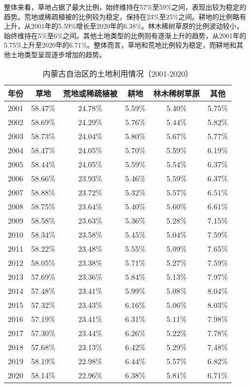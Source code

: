 \documentclass[AutoFakeBold]{LZUThesis-PgD&PhD}
\begin{document}
		整体来看，草地占据了最大比例，始终维持在57\%至59\%之间，表现出较为稳定的趋势。荒地或稀疏植被的比例较为稳定，保持在23\%至25\%之间。耕地的比例略有上升，从2001年的5.59\%增长至2020年的6.38\%。林木稀树草原的比例波动较小，始终维持在5\%至6\%之间。其他土地类型的比例则有逐渐上升的趋势，从2001年的5.75\%上升至2020年的6.71\%。整体而言，草地和荒地比例较为稳定，而耕地和其他土地类型呈现逐步增加的趋势。

		\begin{table}[H]
			\centering
			\begin{tabular}{|c|c|c|c|c|c|}
				\hline
				年份 & 草地 & 荒地或稀疏植被 & 耕地 & 林木稀树草原 & 其他 \\
				\hline
				2001 & 58.47\% & 24.78\% & 5.59\% & 5.40\% & 5.75\% \\
				2002 & 58.69\% & 24.29\% & 5.76\% & 5.44\% & 5.82\% \\
				2003 & 58.73\% & 24.04\% & 5.80\% & 5.67\% & 5.77\% \\
				2004 & 58.47\% & 24.05\% & 5.70\% & 5.59\% & 6.19\% \\
				2005 & 58.44\% & 24.05\% & 5.59\% & 5.54\% & 6.37\% \\
				2006 & 58.66\% & 23.93\% & 5.46\% & 5.59\% & 6.37\% \\
				2007 & 58.88\% & 23.72\% & 5.32\% & 5.57\% & 6.51\% \\
				2008 & 58.75\% & 23.64\% & 5.40\% & 5.60\% & 6.61\% \\
				2009 & 58.58\% & 23.63\% & 5.36\% & 5.28\% & 7.15\% \\
				2010 & 58.34\% & 23.58\% & 5.45\% & 5.04\% & 7.59\% \\
				2011 & 58.22\% & 23.48\% & 5.55\% & 5.09\% & 7.65\% \\
				2012 & 58.05\% & 23.38\% & 5.71\% & 5.27\% & 7.59\% \\
				2013 & 57.69\% & 23.36\% & 5.84\% & 5.13\% & 7.97\% \\
				2014 & 57.48\% & 23.41\% & 5.99\% & 5.08\% & 8.04\% \\
				2015 & 57.32\% & 23.43\% & 6.16\% & 5.06\% & 8.03\% \\
				2016 & 57.19\% & 23.41\% & 6.31\% & 5.11\% & 7.98\% \\
				2017 & 57.30\% & 23.44\% & 6.26\% & 5.22\% & 7.78\% \\
				2018 & 57.68\% & 23.13\% & 6.42\% & 5.29\% & 7.48\% \\
				2019 & 58.19\% & 22.98\% & 6.44\% & 5.57\% & 6.82\% \\
				2020 & 58.14\% & 22.96\% & 6.38\% & 5.81\% & 6.71\% \\
				\hline
			\end{tabular}
			\caption{内蒙古自治区的土地利用情况（2001-2020）}
		\end{table}
		
\end{document}
